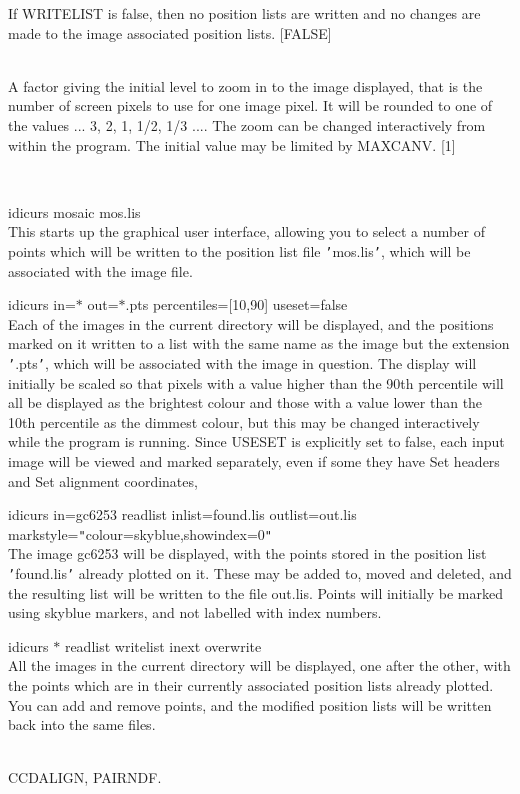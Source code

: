 \documentclass[twoside,11pt]{article}
\newcommand{\htmlref}[2]{#1}
\renewcommand{\_}{\texttt{\symbol{95}}}
\newcommand{\xroutine}[1]{\htmlref{{\sc #1}}{#1}}
\newcommand{\sstexamples}[1]{
   \item[Examples:] \mbox{} \\
   \vspace{-3.5ex}
   \begin{description}
      #1
   \end{description}
}
\newcommand{\sstsubsection}[1]{ \item[{#1}] \mbox{} \\}
\newcommand{\sstexamplesubsection}[2]{\sloppy \item{\ssttt #1} \mbox{} \\ #2 }
\newcommand{\sstnotes}[1]{\item[Notes:] \mbox{} \\[1.3ex] #1}
\newcommand{\sstdiytopic}[2]{\item[#1:] \mbox{} \\[1.3ex] #2}
\newcommand{\sstitemlist}[1]{
  \mbox{} \\
  \vspace{-3.5ex}
  \begin{itemize}
     #1
  \end{itemize}
}
\newcommand{\sstexamples}[1]{
      \item[Examples:] \\
      \begin{description}
         #1
      \end{description}
      \\
   }
\newcommand{\sstsubsection}[1]{\item[{#1}]}
\newcommand{\sstexamplesubsection}[2]{\item[{\ssttt #1}] #2}
\newcommand{\sstnotes}[1]{\item[Notes:] #1 }
\newcommand{\sstdiytopic}[2]{\item[{#1:}] #2 }
\newcommand{\sstitemlist}[1]{
      \begin{itemize}
         #1
      \end{itemize}
      \\
   }
\begin{document}
{{{         If WRITELIST is false, then no position lists are written and
         no changes are made to the image associated position lists.
         [FALSE]
      }
      \sstsubsection{
         ZOOM = \_INTEGER (Read and Write)
      }{
         A factor giving the initial level to zoom in to the image
         displayed, that is the number of screen pixels to use for one
         image pixel.  It will be rounded to one of the values
         ... 3, 2, 1, 1/2, 1/3 ....  The zoom can be changed
         interactively from within the program.  The initial value
         may be limited by MAXCANV.
         [1]
      }
   }
   \sstexamples{
      \sstexamplesubsection{
         idicurs mosaic mos.lis
      }{
         This starts up the graphical user interface, allowing you to
         select a number of points which will be written to the
         position list file {\tt '}mos.lis{\tt '}, which will be associated with
         the image file.
      }
      \sstexamplesubsection{
         idicurs in=$*$ out=$*$.pts percentiles=[10,90] useset=false
      }{
         Each of the images in the current directory will be displayed,
         and the positions marked on it written to a list with the same
         name as the image but the extension {\tt '}.pts{\tt '}, which will be
         associated with the image in question.  The display will
         initially be scaled so that pixels with a value higher than
         the 90th percentile will all be displayed as the brightest
         colour and those with a value lower than the 10th percentile
         as the dimmest colour, but this may be changed interactively
         while the program is running.  Since USESET is explicitly
         set to false, each input image will be viewed and marked
         separately, even if some they have Set headers and Set
         alignment coordinates,
      }
      \sstexamplesubsection{
         idicurs in=gc6253 readlist inlist=found.lis outlist=out.lis
              markstyle={\tt "}colour=skyblue,showindex=0{\tt "}
      }{
         The image gc6253 will be displayed, with the points stored in
         the position list {\tt '}found.lis{\tt '} already plotted on it.  These
         may be added to, moved and deleted, and the resulting list
         will be written to the file out.lis.  Points will initially
         be marked using skyblue markers, and not labelled with index
         numbers.
      }
      \sstexamplesubsection{
         idicurs $*$ readlist writelist inext overwrite
      }{
         All the images in the current directory will be displayed,
         one after the other, with the points which are in their
         currently associated position lists already plotted.
         You can add and remove points, and the modified position
         lists will be written back into the same files.
      }
   }
   \sstdiytopic{
      See also
   } {
      \xroutine{CCDALIGN}, 
      \xroutine{PAIRNDF}.
   }
   \sstnotes{
      \sstitemlist{

}}}
\end{document}
